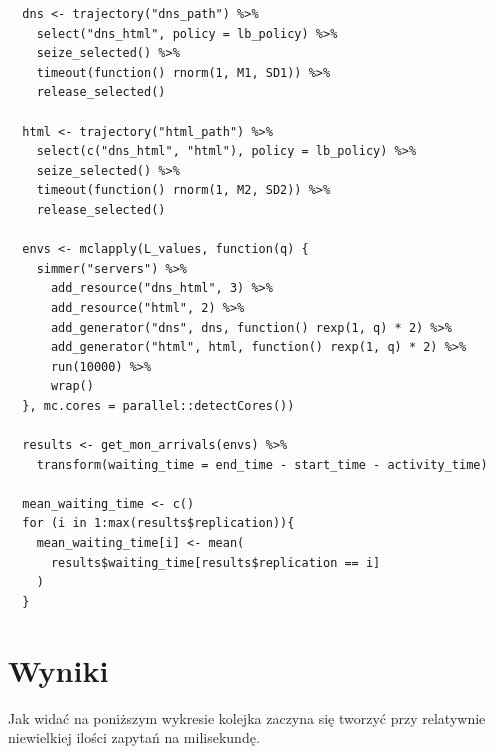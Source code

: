 \documentclass[12pt,oneside,a4paper]{book} %
\theoremstyle{break}
\begin{document}
\begin{verbatim}
  dns <- trajectory("dns_path") %>%
    select("dns_html", policy = lb_policy) %>% 
    seize_selected() %>%
    timeout(function() rnorm(1, M1, SD1)) %>%
    release_selected()

  html <- trajectory("html_path") %>%
    select(c("dns_html", "html"), policy = lb_policy) %>%
    seize_selected() %>%
    timeout(function() rnorm(1, M2, SD2)) %>%
    release_selected()

  envs <- mclapply(L_values, function(q) {
    simmer("servers") %>%
      add_resource("dns_html", 3) %>%
      add_resource("html", 2) %>%
      add_generator("dns", dns, function() rexp(1, q) * 2) %>%
      add_generator("html", html, function() rexp(1, q) * 2) %>%
      run(10000) %>%
      wrap()
  }, mc.cores = parallel::detectCores())

  results <- get_mon_arrivals(envs) %>% 
    transform(waiting_time = end_time - start_time - activity_time)

  mean_waiting_time <- c()
  for (i in 1:max(results$replication)){
    mean_waiting_time[i] <- mean(
      results$waiting_time[results$replication == i]
    )
  }
\end{verbatim}

\section*{Wyniki}

Jak widać na poniższym wykresie kolejka zaczyna się tworzyć przy relatywnie niewielkiej ilości zapytań na milisekundę.
\end{document}

